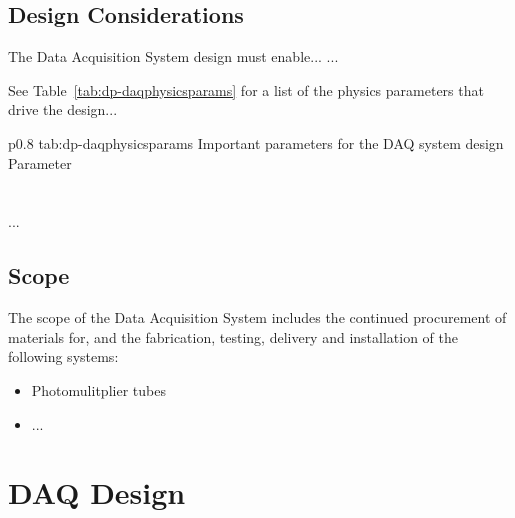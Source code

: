 \subsection{Design Considerations}
\label{sec:fddp-daq-des-consid}


The Data Acquisition System design must enable... 
...


See Table~\ref{tab:dp-daqphysicsparams} for a list of the physics parameters that drive the design...

\begin{dunetable}
{p{0.8\textwidth}}
{tab:dp-daqphysicsparams}
{Important parameters for the DAQ system design}   
Parameter  \\ \toprowrule
  \\ \colhline
   \\ \colhline
 ...\\ 
\end{dunetable}


\subsection{Scope}
\label{sec:fddp-daq-scope}

The scope of the Data Acquisition System includes the continued procurement of materials for, and the fabrication, testing, delivery and installation of the following systems: 


\begin{itemize}
\item Photomulitplier tubes 
\item  ...
\end{itemize}



\section{DAQ Design}
\label{sec:fddp-daq-design}



